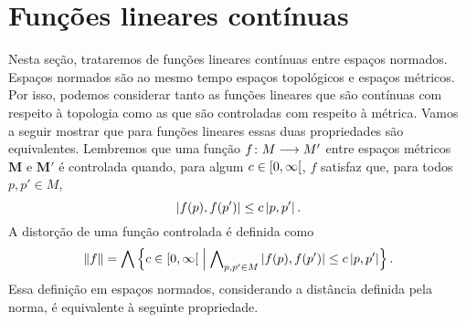 \section{Funções lineares contínuas}


Nesta seção, trataremos de funções lineares contínuas entre espaços normados. Espaços normados são ao mesmo tempo espaços topológicos e espaços métricos. Por isso, podemos considerar tanto as funções lineares que são contínuas com respeito à topologia como as que são controladas com respeito à métrica. Vamos a seguir mostrar que para funções lineares essas duas propriedades são equivalentes. Lembremos que uma função ${f}\colon {M} \longrightarrow {M'}$ entre espaços métricos $\bm M$ e $\bm M'$ é controlada quando, para algum $c \in \left[{0},{\infty}\right[$, $f$ satisfaz que, para todos $p,p' \in M$,
	\begin{equation*}
	\left\vert{f(p)},{f(p')}\right\vert \leq c\left\vert{p},{p'}\right\vert.
	\end{equation*}
A distorção de uma função controlada é definida como
	\begin{equation*}
	\left\Vert{f}\right\Vert = \bigwedge\left\{{c \in \left[{0},{\infty}\right[}\;\middle\vert\;{\bigwedge\nolimits_{p,p' \in M} \left\vert{f(p)},{f(p')}\right\vert \leq c\left\vert{p},{p'}\right\vert}\right\}.
	\end{equation*}
Essa definição em espaços normados, considerando a distância definida pela norma, é equivalente à seguinte propriedade.



